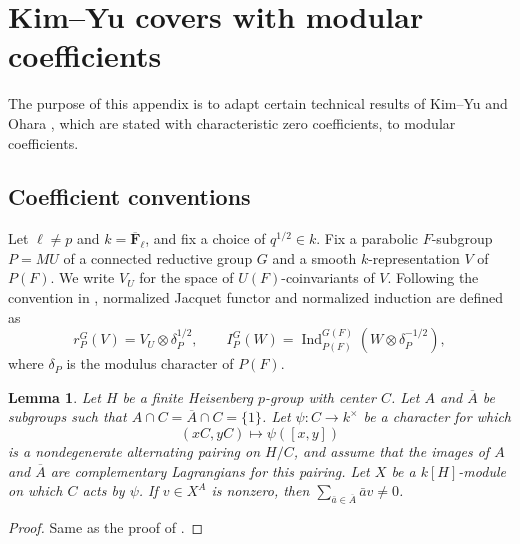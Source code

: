 \documentclass[reqno]{amsart}
\numberwithin{equation}{subsection}
\newcommand{\F}{\mathbf{F}}
\newcommand{\ol}[1]{\overline{#1}}
\newcommand{\co}{\colon}
\DeclareMathOperator{\Ind}{Ind}
\newtheorem{lemma}[thm]{Lemma}
\theoremstyle{remark}
\numberwithin{equation}{subsection}
\numberwithin{figure}{subsection}
\begin{document}
\section{Kim--Yu covers with modular coefficients}
\label{app:kim-yu-ohara-coefficients}

The purpose of this appendix is to adapt certain technical results of Kim--Yu \cite{KY17} and Ohara \cite{Ohara24}, which are stated with characteristic zero coefficients, to modular coefficients. 

\subsection{Coefficient conventions}
Let \(\ell\neq p\) and \(k=\ol\F_\ell\), and fix a choice of $q^{1/2} \in k$. %
Fix a parabolic \(F\)-subgroup \(P=MU\) of a connected reductive group \(G\) and a smooth $k$-representation $V$ of $P(F)$. We
write \(V_U\) for the space of $U(F)$-coinvariants of $V$. Following the convention
in \cite[\S 2]{Ohara24}, normalized Jacquet functor and normalized induction
are defined as
\[
r_P^G(V)=V_U\otimes\delta_P^{1/2},
\qquad
I_P^G(W)=\Ind_{P(F)}^{G(F)}(W\otimes\delta_P^{-1/2}),
\]
where $\delta_P$ is the modulus character of $P(F)$.


\begin{lemma}\label{lem:heisenberg-step}
Let $H$ be a finite Heisenberg $p$-group with center $C$. Let $A$ and $\ol A$ be subgroups such that $A\cap C=\ol A\cap C=\{1\}$. Let $\psi\co C\to k^\times$ be a character for which
\[
(xC,yC)\longmapsto \psi([x,y])
\]
is a nondegenerate alternating pairing on $H/C$, and assume that the images of $A$ and $\ol A$ are complementary Lagrangians for this pairing. Let $X$ be a $k[H]$-module on which $C$ acts by $\psi$. If $v\in X^A$ is
nonzero, then $\sum_{\bar a\in\ol A}\bar a v \neq 0$.
\end{lemma}

\begin{proof}
Same as the proof of \cite[Lemma 5.5]{KY17}.
\end{proof}
\end{document}
